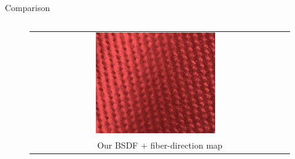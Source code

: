 \documentclass[final]{beamer}
\newlength{\onecolwid}
\newlength{\twocolwid}
\begin{document}
\begin{frame}[t]
\begin{columns}[t]
\begin{column}{\twocolwid}
\begin{block}{Comparison}
\begin{columns}[t,totalwidth=\twocolwid]
\begin{column}{\onecolwid}
\begin{figure}
\begin{tabular}{cc}
                    		\includegraphics[width=0.49\textwidth]{results/gabardine_inset_512spp.jpg} \\
                    		\multicolumn{2}{c}{\small{Our BSDF + fiber-direction map}}
                    	\end{tabular}
                    \end{figure} 
                \end{column}
            \end{columns}
        \end{block}
    \end{column}
    

\end{columns}
\end{frame}
\end{document}
